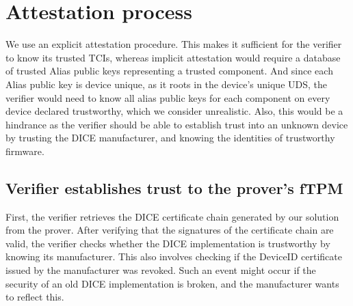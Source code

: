
\section{Attestation process}\label{sec:attestation_process}


We use an explicit attestation procedure.
This makes it sufficient for the verifier to know its trusted TCIs, whereas implicit attestation would require a database of trusted Alias public keys representing a trusted component.
And since each Alias public key is device unique, as it roots in the device's unique \ac{UDS}, the verifier would need to know all alias public keys for each component on every device declared trustworthy, which we consider unrealistic.
Also, this would be a hindrance as the verifier should be able to establish trust into an unknown device by trusting the DICE manufacturer, and knowing the identities of trustworthy firmware.


\subsection{Verifier establishes trust to the prover's fTPM}\label{subsec:trust_prover_tpm}

First, the verifier retrieves the DICE certificate chain generated by our solution from the prover.
After verifying that the signatures of the certificate chain are valid, the verifier checks whether the DICE implementation is trustworthy by knowing its manufacturer.
This also involves checking if the DeviceID certificate issued by the manufacturer was revoked.
Such an event might occur if the security of an old DICE implementation is broken, and the manufacturer wants to reflect this.

